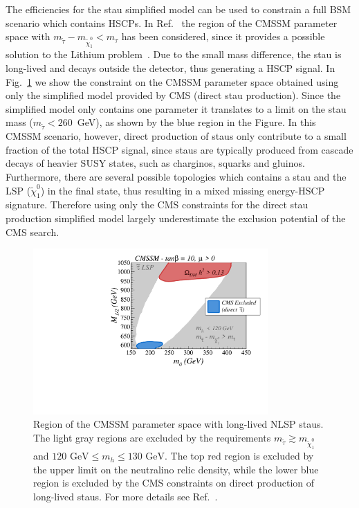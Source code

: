 The efficiencies for the stau simplified model
can be used to constrain a full BSM scenario which contains
HSCPs. In Ref.~\cite{Heisig:2015yla} the region of the CMSSM parameter
space with $m_{\tilde \tau} - m_{\tilde \chi_1^0} < m_{\tau}$ has been
considered, since it provides a possible solution to the Lithium
problem~\cite{Spite:1982dd, Cyburt:2008kw}. Due to the small
mass difference, the stau is long-lived and decays outside the detector,
thus generating a HSCP signal.
In Fig.~\ref{fig:cmssmA} we show the constraint on the CMSSM parameter
space obtained using only the simplified model provided by CMS (direct stau
production).
Since the simplified model only contains one parameter it
translates to a limit on the stau mass ($m_{\tilde \tau} < 260$~GeV),
as shown by the blue region in the Figure.
In this CMSSM scenario, however, direct production of staus only contribute to a
small fraction of the total HSCP signal, since staus are typically produced from
cascade decays of heavier SUSY states, such as charginos, squarks and gluinos.
Furthermore, there are several possible topologies which contains a stau and the
LSP ($\tilde \chi_1^0$) in the final state, thus resulting in a
mixed missing energy-HSCP signature.
Therefore using only the CMS constraints for the direct stau production
simplified model largely underestimate the exclusion potential of the CMS
search. 


\begin{figure}[!h]
\centering
\includegraphics[width=0.8\textwidth]{ch5-figures/sms_exclusion_direct.pdf}
\caption{Region of the CMSSM parameter space with long-lived NLSP staus.
The light gray regions are excluded by the requirements $m_{\tilde \tau} \gtrsim
m_{\tilde \chi_1^0}$ and $ 120 \mbox{ GeV} \leq m_h \leq 130 \mbox{ GeV}$.
The top red region is excluded by the upper limit on the neutralino relic
density, while the lower blue region is excluded by the CMS constraints
on direct production of long-lived staus. For more details see Ref.~\cite{Heisig:2015yla}.
}
\label{fig:cmssmA}
\end{figure}


